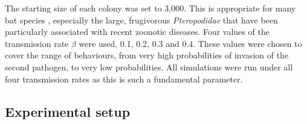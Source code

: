 The starting size of each colony was set to 3,000. 
This is appropriate for many bat species \cite{jones2009pantheria}, especially the large, frugivorous \emph{Pteropodidae} that have been particularly associated with recent zoonotic diseases.
Four values of the transmission rate $\beta$ were used, 0.1, 0.2, 0.3 and 0.4.
These values were chosen to cover the range of behaviours, from very high probabilities of invasion of the second pathogen, to very low probabilities.
All simulations were run under all four transmission rates as this is such a fundamental parameter.





\subsection{Experimental setup}

